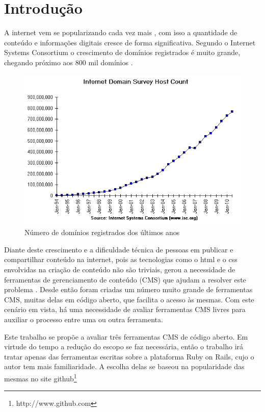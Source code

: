\chapter{Introdução}

A internet vem se popularizando cada vez mais \cite{internet_stats}, com isso a quantidade de conteúdo e informações digitais cresce de forma significativa. Segundo o Internet Systems Consortium o crescimento de domínios registrados é muito grande, chegando próximo aos 800 mil domínios \cite{isc}. 

\begin{figure}[here]
\includegraphics[width=150mm]{images/isc_hosts.png}
\caption{Número de domínios registrados dos últimos anos}
\label{fig:isc_hosts.png}
\end{figure}

Diante deste crescimento e a dificuldade técnica de pessoas em publicar e compartilhar conteúdo na internet, pois as  tecnologias como o html e o css envolvidas na criação de conteúdo não são triviais, gerou a necessidade de ferramentas de gerenciamento de conteúdo (CMS) que ajudam a resolver este problema \cite{content_for_one}. Desde então foram criadas um número muito grande de ferramentas CMS, muitas delas em código aberto, que facilita o acesso às mesmas. Com este cenário em vista, há uma necessidade de avaliar ferramentas CMS livres para auxiliar o processo entre uma ou outra ferramenta.

Este trabalho se propõe a avaliar três ferramentas CMS de código aberto. Em virtude do tempo a redução do escopo se faz necessária, então o trabalho irá tratar apenas das ferramentas escritas sobre a plataforma Ruby on Rails, cujo o autor tem mais familiaridade. A escolha delas se baseou na popularidade das mesmas no site github\footnote{http://www.github.com}

